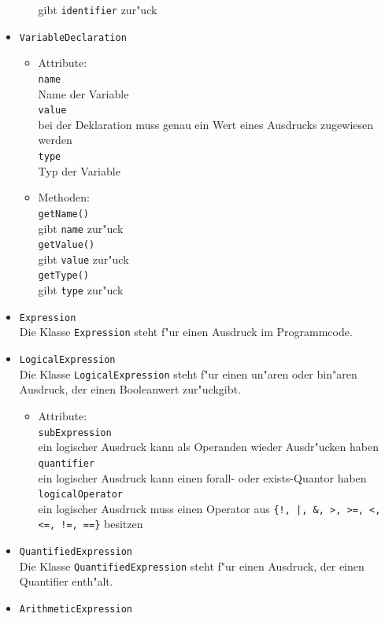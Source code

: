 \documentclass[10pt,a4paper,titlepage]{article}
\begin{document}
\begin{itemize}
\begin{itemize}
gibt \texttt{identifier} zur"uck
\end{itemize}
\item \texttt{VariableDeclaration}
\begin{itemize}
\item Attribute: \\
\texttt{name} \\
Name der Variable \\
\texttt{value} \\
bei der Deklaration muss genau ein Wert eines Ausdrucks zugewiesen werden \\
\texttt{type} \\
Typ der Variable 
\item Methoden: \\
\texttt{getName()} \\
gibt \texttt{name} zur"uck \\
\texttt{getValue()} \\
gibt \texttt{value} zur"uck \\
\texttt{getType()} \\
gibt \texttt{type} zur"uck
\end{itemize}
\item \texttt{Expression} \\
Die Klasse \texttt{Expression} steht f"ur einen Ausdruck im Programmcode. 
\item \texttt{LogicalExpression} \\
Die Klasse \texttt{LogicalExpression} steht f"ur einen un"aren oder bin"aren Ausdruck, der einen Booleanwert zur"uckgibt.
\begin{itemize}
\item Attribute: \\
\texttt{subExpression} \\
ein logischer Ausdruck kann als Operanden wieder Ausdr"ucken haben \\
\texttt{quantifier} \\
ein logischer Ausdruck kann einen forall- oder exists-Quantor haben \\
\texttt{logicalOperator} \\
ein logischer Ausdruck muss einen Operator aus \texttt{\{!, |, \&, >, >=, <, <=, !=, ==\}} besitzen 
\end{itemize}
\item \texttt{QuantifiedExpression} \\
Die Klasse \texttt{QuantifiedExpression} steht f"ur einen Ausdruck, der einen Quantifier enth"alt.
\item \texttt{ArithmeticExpression} \\

\end{itemize}
\end{document}

